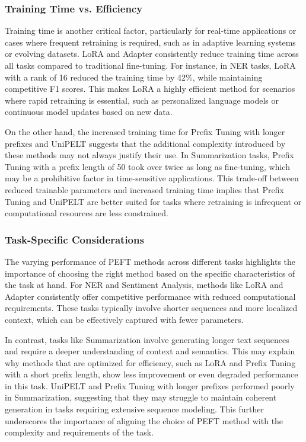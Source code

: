 \subsubsection{\textbf{Training Time vs. Efficiency}}
Training time is another critical factor, particularly for real-time applications or cases where frequent retraining is required, such as in adaptive learning systems or evolving datasets. LoRA and Adapter consistently reduce training time across all tasks compared to traditional fine-tuning. For instance, in NER tasks, LoRA with a rank of 16 reduced the training time by 42\%, while maintaining competitive F1 scores. This makes LoRA a highly efficient method for scenarios where rapid retraining is essential, such as personalized language models or continuous model updates based on new data.

On the other hand, the increased training time for Prefix Tuning with longer prefixes and UniPELT suggests that the additional complexity introduced by these methods may not always justify their use. In Summarization tasks, Prefix Tuning with a prefix length of 50 took over twice as long as fine-tuning, which may be a prohibitive factor in time-sensitive applications. This trade-off between reduced trainable parameters and increased training time implies that Prefix Tuning and UniPELT are better suited for tasks where retraining is infrequent or computational resources are less constrained.

\subsubsection{\textbf{Task-Specific Considerations}}
The varying performance of PEFT methods across different tasks highlights the importance of choosing the right method based on the specific characteristics of the task at hand. For NER and Sentiment Analysis, methods like LoRA and Adapter consistently offer competitive performance with reduced computational requirements. These tasks typically involve shorter sequences and more localized context, which can be effectively captured with fewer parameters.

In contrast, tasks like Summarization involve generating longer text sequences and require a deeper understanding of context and semantics. This may explain why methods that are optimized for efficiency, such as LoRA and Prefix Tuning with a short prefix length, show less improvement or even degraded performance in this task. UniPELT and Prefix Tuning with longer prefixes performed poorly in Summarization, suggesting that they may struggle to maintain coherent generation in tasks requiring extensive sequence modeling. This further underscores the importance of aligning the choice of PEFT method with the complexity and requirements of the task.

